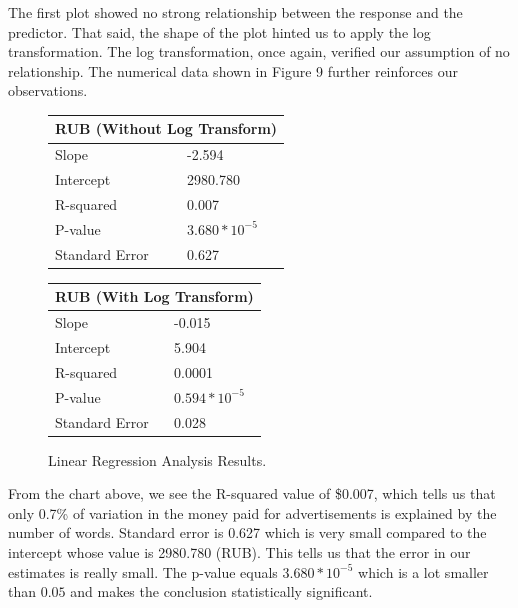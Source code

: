 \documentclass[12pt]{article}
\theoremstyle{definition}
\begin{document}
\bigskip

The first plot showed no strong relationship between the response and the
predictor. That said, the shape of the plot hinted us to apply the log
transformation. The log transformation, once again, verified our assumption
of no relationship. The numerical data shown in Figure 9 further reinforces our
observations.

\bigskip

\begin{figure}[H]
\begin{center}
\begin{tabular}{|p{3cm}|p{3cm}|}
 \hline
 \multicolumn{2}{|c|}{RUB (Without Log Transform)}\\
 \hline
 Slope          & -2.594\\
 \hline
 Intercept      & 2980.780\\
 \hline
 R-squared      & 0.007\\
 \hline
 P-value        & $3.680 * 10^{-5}$\\
 \hline
 Standard Error & 0.627\\
 \hline
\end{tabular}
\qquad
\begin{tabular}{|p{3cm}|p{3cm}|}
 \hline
 \multicolumn{2}{|c|}{RUB (With Log Transform)}\\
 \hline
 Slope          & -0.015\\
 \hline
 Intercept      & 5.904\\
 \hline
 R-squared      & 0.0001\\
 \hline
 P-value        & $0.594 * 10^{-5}$\\
 \hline
 Standard Error & 0.028\\
 \hline
\end{tabular}
\end{center}
\caption{Linear Regression Analysis Results.}
\end{figure}

\bigskip

From the chart above, we see the R-squared value of \$0.007, which tells us
that only 0.7\% of variation in the money paid for advertisements is explained
by the number of words. Standard error is 0.627 which is very small compared
to the intercept whose value is 2980.780 (RUB). This tells us that the error
in our estimates is really small. The p-value equals $3.680 * 10^{-5}$ which
is a lot smaller than $0.05$ and makes the conclusion statistically significant.

\bigskip
\end{document}
